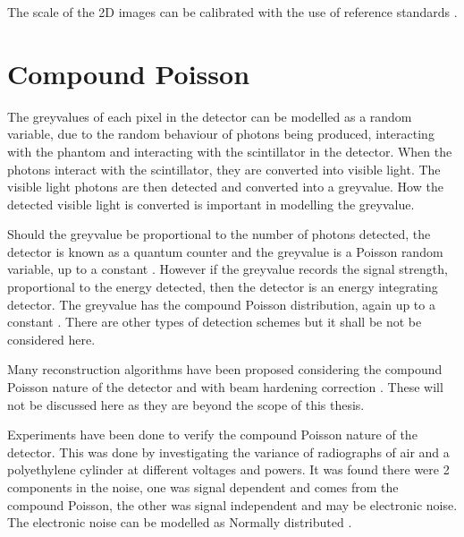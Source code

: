 The scale of the 2D images can be calibrated with the use of reference standards \citep{bartscher2007enhancement} \citep{lifton2013application}.

\section{Compound Poisson}

The greyvalues of each pixel in the detector can be modelled as a random variable, due to the random behaviour of photons being produced, interacting with the phantom and interacting with the scintillator in the detector. When the photons interact with the scintillator, they are converted into visible light. The visible light photons are then detected and converted into a greyvalue. How the detected visible light is converted is important in modelling the greyvalue.

Should the greyvalue be proportional to the number of photons detected, the detector is known as a quantum counter and the greyvalue is a Poisson random variable, up to a constant \citep{whiting2006properties}. However if the greyvalue records the signal strength, proportional to the energy detected, then the detector is an energy integrating detector. The greyvalue has the compound Poisson distribution, again up to a constant \citep{whiting2006properties}. There are other types of detection schemes \citep{whiting2006properties} but it shall be not be considered here.

Many reconstruction algorithms have been proposed considering the compound Poisson nature of the detector \citep{elbakri2002statistical} \citep{elbakri2003statistical} \citep{lasio2007statistical} \citep{xie2008x} and with beam hardening correction \citep{elbakri2003efficient}. These will not be discussed here as they are beyond the scope of this thesis.

Experiments have been done to verify the compound Poisson nature of the detector. This was done by investigating the variance of radiographs of air \citep{hsieh2015compound} and a polyethylene cylinder \citep{yang2009evaluation} \citep{yang2010noise} at different voltages and powers. It was found there were 2 components in the noise, one was signal dependent and comes from the compound Poisson, the other was signal independent and may be electronic noise. The electronic noise can be modelled as Normally distributed \citep{xu2009electronic}.

